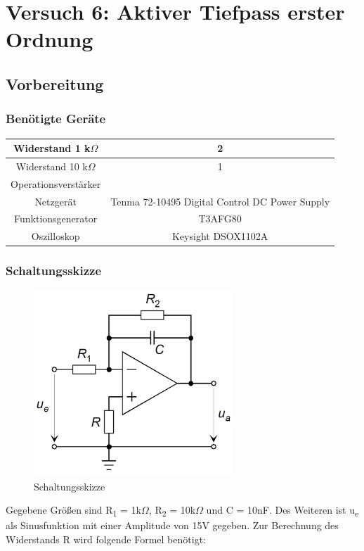 \chapter{Versuch 6: Aktiver Tiefpass erster Ordnung}

\section{Vorbereitung}

\subsection{Benötigte Geräte}

\begin{tabular}[h]{c|c}
    Widerstand 1 k$\Omega$ & 2\\
    \hline
    Widerstand 10 k$\Omega$ & 1\\
    \hline
    Operationsverstärker & \\
    \hline
    Netzgerät & Tenma 72-10495 Digital Control DC Power Supply\\
    \hline
    Funktionsgenerator & T3AFG80\\
    \hline
    Oszilloskop & Keysight DSOX1102A
    \label{tab:Versuch 6: Geräte}
\end{tabular}
\subsection{Schaltungsskizze}

\begin{figure}[H]
    \centering
    \includegraphics[height=7cm]{images/Versuch6/Schaltungsskizze.jpeg} 
    \caption{Schaltungsskizze}
    \label{fig: Schaltungsskizze}
\end{figure}
Gegebene Größen sind R\textsubscript{1} = 1k$\Omega$,
R\textsubscript{2} = 10k$\Omega$ und C = 10nF.
Des Weiteren ist u\textsubscript{e} als Sinusfunktion mit einer
Amplitude von 15V gegeben.
Zur Berechnung des Widerstands R wird folgende Formel benötigt:

